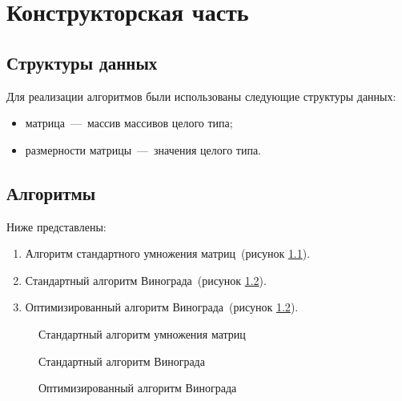 \chapter{Конструкторская часть}

\section{Структуры данных}

Для реализации алгоритмов были использованы следующие структуры данных:
\begin{itemize}[label=---]
	\item матрица~---~массив массивов целого типа;
	\item размерности матрицы~---~значения целого типа.
\end{itemize}

\section{Алгоритмы}

Ниже представлены:

\begin{enumerate}[label=\arabic*)]
	\item Алгоритм стандартного умножения матриц~(рисунок \ref{img:standartMul}).
	\item Стандартный алгоритм Винограда~(рисунок \ref{img:standartWinograd}).
	\item Оптимизированный алгоритм Винограда~(рисунок \ref{img:standartWinograd}).
\end{enumerate}


\begin{figure}[H]
	\centering
	
	\caption{Стандартный алгоритм умножения матриц}
	\label{img:standartMul}
\end{figure}

\newpage
\begin{figure}[H]
	\centering
	
	\caption{Стандартный алгоритм Винограда}
	\label{img:standartWinograd}
\end{figure}

\newpage
\begin{figure}[H]
	\centering
	
	\caption{Оптимизированный алгоритм Винограда}
	\label{img:optWinograd}
\end{figure}




